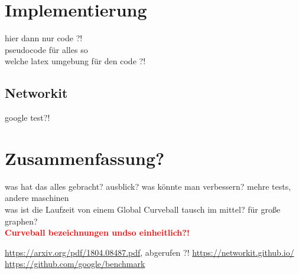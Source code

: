 \documentclass[a4paper]{scrreprt}
\theoremstyle{plain} %
\theoremstyle{definition} %
\newcommand{\gc}{Global Curveball }
\newcommand{\cb}{Curveball }
\newcommand{\red}[1]{\textcolor{red}{\textbf{#1}}}
\begin{document}
\chapter{Implementierung}
hier dann nur code ?! 
\\
pseudocode für alles so
\\
welche latex umgebung für den code ?!
\section{Networkit}
google test?!





\chapter{Zusammenfassung?}
was hat das alles gebracht?
ausblick?
was könnte man verbessern? mehre tests, andere maschinen
\\
was ist die Laufzeit von einem \gc tausch im mittel? für große graphen?
\\
\red{\Large \cb bezeichnungen undso einheitlich?!}



\begin{thebibliography}{2}
 \url{https://arxiv.org/pdf/1804.08487.pdf}, abgerufen ?!
 \url{https://networkit.github.io/}
 \url{https://github.com/google/benchmark}
\end{thebibliography}


\listoffigures
\end{document}

